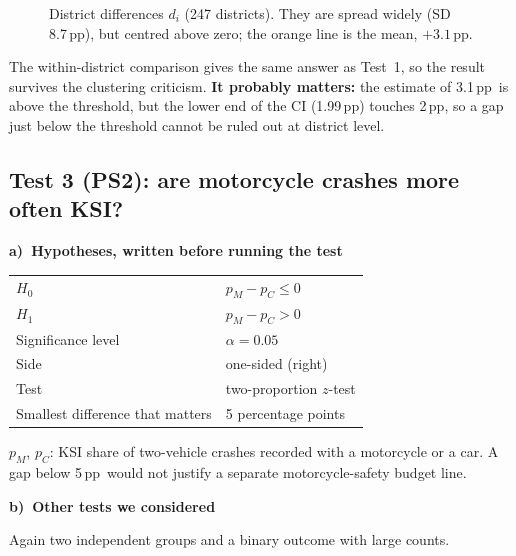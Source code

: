 \documentclass[10pt,a4paper,twocolumn]{article}
\newcommand{\tpart}[2]{\par\needspace{12\baselineskip}\smallskip\textbf{#1)~#2}\par}
\newcommand{\pp}{\,pp}
\begin{document}
\begin{figure}[!ht]
\centering
{}
\caption{District differences $d_i$ (247 districts). They are spread widely (SD 8.7\pp), but
centred above zero; the orange line is the mean, $+3.1$\pp.}
\label{fig:dist}
\end{figure}

The within-district comparison gives the same answer as Test~1, so the result survives the
clustering criticism. \textbf{It probably matters:} the estimate of 3.1\pp\ is above the
threshold, but the lower end of the CI (1.99\pp) touches 2\pp, so a gap just below the threshold
cannot be ruled out at district level.

\subsection*{Test 3 (PS2): are motorcycle crashes more often KSI?}

\tpart{a}{Hypotheses, written before running the test}
{\small
\begin{tabularx}{\linewidth}{@{}K{3.4cm} Y@{}}
\toprule
$H_0$ & $p_M-p_C\le0$ \\
$H_1$ & $p_M-p_C>0$ \\
Significance level & $\alpha=0.05$ \\
Side & one-sided (right) \\
Test & two-proportion $z$-test \\
Smallest difference that matters & 5 percentage points \\
\bottomrule
\end{tabularx}}

$p_M$, $p_C$: KSI share of two-vehicle crashes recorded with a motorcycle or a car. A gap below
5\pp\ would not justify a separate motorcycle-safety budget line.

\tpart{b}{Other tests we considered}
Again two independent groups and a binary outcome with large counts.
\end{document}
